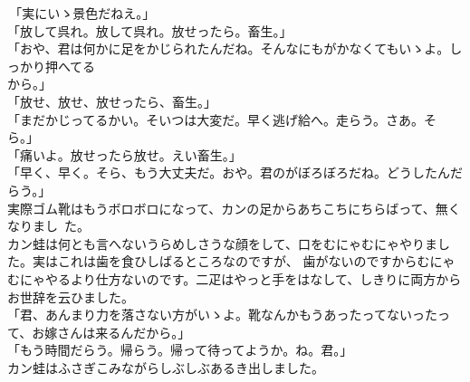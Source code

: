 \documentclass[
a4paper,
10pt,
book]
{tarticle}
\begin{document}
\newpage
\setcounter{page}{22}
\thispagestyle{fancy}
\begin{linenumbers}
    \noindent \,「実にいゝ景色だねえ。」\\
    「放して呉れ。放して呉れ。放せったら。畜生。」\\
    「おや、君は何かに足をかじられたんだね。そんなにもがかなくてもいゝよ。しっかり押へてる\\
    \indent から。」\\
    「放せ、放せ、放せったら、畜生。」\\
    「まだかじってるかい。そいつは大変だ。早く逃げ給へ。走らう。さあ。そら。」\\
    「痛いよ。放せったら放せ。えい畜生。」\\
    「早く、早く。そら、もう大丈夫だ。おや。君のがぼろぼろだね。どうしたんだらう。」\\
    \indent 実際ゴム靴はもうボロボロになって、カンの足からあちこちにちらばって、無くなりまし~た。\\
    \indent カン蛙は何とも言へないうらめしさうな顔をして、口をむにゃむにゃやりました。実はこれは歯を食ひしばるところなのですが、
    歯がないのですからむにゃむにゃやるより仕方ないのです。二疋はやっと手をはなして、しきりに両方からお世辞を云ひました。\\
    「君、あんまり力を落さない方がいゝよ。靴なんかもうあったってないったって、お嫁さんは来るんだから。」\\
    「もう時間だらう。帰らう。帰って待ってようか。ね。君。」\\
    \indent カン蛙はふさぎこみながらしぶしぶあるき出しました。
\end{linenumbers}
\end{document}
